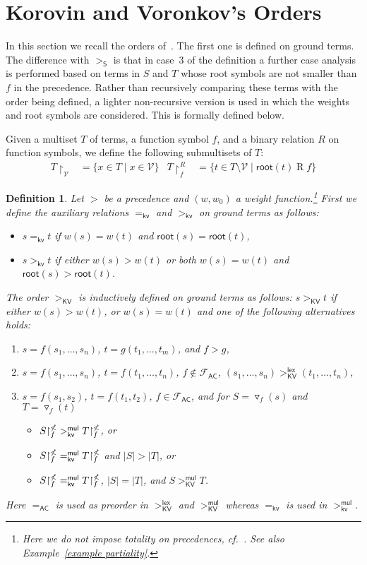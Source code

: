 \documentclass{tlp}
\newtheorem{definition}[theorem]{Definition}
\newcommand{\tf}[1]{{\triangledown_{\!#1}}}
\newcommand{\m}[1]{\mathsf{#1}}
\newcommand{\mc}[1]{\mathcal{#1}}
\newcommand{\mr}[1]{\mathrm{#1}}
\newcommand{\rt}{\m{root}}
\newcommand{\Wt}{\m{w,root}}
\renewcommand{\Wt}{\m{kv}}
\newcommand{\lex}{\m{lex}}
\newcommand{\mul}{\m{mul}}
\newcommand{\FF}{\mc{F}}
\newcommand{\VV}{\mc{V}}
\newcommand{\AC}{\mr{\m{AC}}}
\newcommand{\steinbach}{\mr{\m{S}}}
\newcommand{\KV}{\mr{\m{KV}}}
\newcommand{\seq}[2][n]{{#2_1},\dots,{#2_{#1}}}
\newcommand{\rr}[3][f]{{#2}{\restriction}^{#3}_{#1}}
\newcommand{\rrs}[3][f]{{#2}{\restriction}^{\smash{#3}}_{#1}}
\begin{document}
\section{Korovin and Voronkov's Orders}
\label{Korovin and Voronkov}

In this section we recall the orders of~.
The first one is defined on ground terms.
The difference
with $>_\steinbach$ is that in case~3 of the definition a
further case analysis is performed based on 
terms in $S$ and $T$ whose root symbols are
not smaller than $f$ in the precedence.
Rather than recursively comparing these terms with the order being
defined, a lighter non-recursive version is used in which the weights and
root symbols are considered. This is formally defined below.

Given a multiset $T$ of terms, a function symbol $f$, and a binary relation
$R$ on function symbols, we define the following submultisets of $T$: 
\begin{align*}
T{\restriction}_\VV &= \{ x \in T \mid x \in \VV \} &
\rr{T}{R} &= \{ t \in T \setminus \VV \mid \rt(t) \mathrel{R} f \}
\end{align*}

\begin{definition}
\label{def:KV ground}
Let $>$ be a precedence and $(w,w_0)$ a weight function.\footnote{Here we do not impose totality on precedences, cf.\ \cite{KV03b}.
See also Example~\ref{example partiality}.}
First we define the auxiliary relations $=_\Wt$ and $>_\Wt$
on ground terms as follows:
\begin{itemize}
\item
$s =_\Wt t$ if
$w(s) = w(t)$ and $\rt(s) = \rt(t)$,
\item
$s >_\Wt t$ if
either $w(s) > w(t)$ or both $w(s) = w(t)$ and $\rt(s) > \rt(t)$.
\end{itemize}
The order $>_\KV$ is inductively defined on ground terms as follows:
$s >_\KV t$ if either $w(s) > w(t)$, or
$w(s) = w(t)$ and one of the following alternatives holds:
\begin{enumerate}
\item
$s = f(\seq{s})$, $t = g(\seq[m]{t})$, and $f > g$,
\smallskip
\item
$s = f(\seq{s})$, $t = f(\seq{t})$, $f \notin \FF_\AC$,
$(\seq{s}) >_\KV^\lex (\seq{t})$,
\item
\smallskip
$s = f(s_1,s_2)$, $t = f(t_1,t_2)$, $f \in \FF_\AC$,
and for $S = \tf{f}(s)$ and $T = \tf{f}(t)$
\begin{itemize}
\item[(a)]
\smallskip
$\rrs{S}{\nless} >_\Wt^\mul \rrs{T}{\nless}$,
or
\item[(b)]
\smallskip
$\rrs{S}{\nless} =_\Wt^\mul \rrs{T}{\nless}$ and $|S| > |T|$, or
\item[(c)]
\smallskip
$\rrs{S}{\nless} =_\Wt^\mul \rrs{T}{\nless}$, $|S| = |T|$, and
$S >_\KV^\mul T$.
\end{itemize}
\end{enumerate}
Here $=_\AC$ is used as preorder in $>_\KV^\lex$ and $>_\KV^\mul$ whereas
$=_\Wt$ is used in $>_\Wt^\mul$.
\end{definition}
\end{document}
